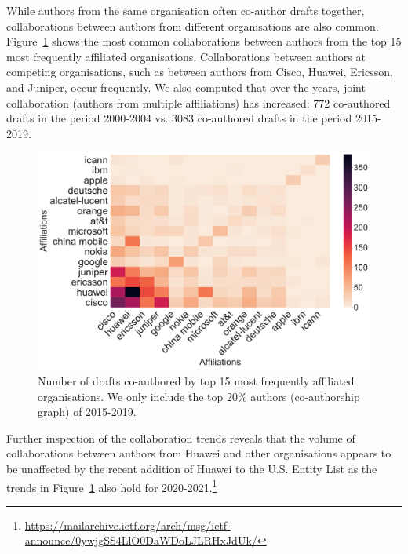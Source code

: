\documentclass[twocolumn,10pt]{article}
\newlength{\figureWidthOneColumn}
\begin{document}
While authors from the same organisation often co-author drafts together,
collaborations between authors from different organisations are also
common.  Figure~\ref{fig:heatmap_2019_coauthordraft_most_frequent_org}
shows the most common collaborations between authors from the top 15 most
frequently affiliated organisations.  Collaborations between authors at
competing organisations, such as between authors from Cisco, Huawei,
Ericsson, and Juniper, occur frequently. We also computed that over the
years, joint collaboration (authors from multiple affiliations) has
increased: 772 co-authored drafts in the period 2000-2004 vs. 3083
co-authored drafts in the period 2015-2019.

\begin{figure}
  \centering
  \includegraphics[width=\figureWidthOneColumn]{figures-prev/icwsm-2022/coauthor_affiliation_network/heatmap_2019_top10_affiliation_collaboration.pdf}
  \caption{
    Number of drafts co-authored by top 15 most frequently affiliated
    organisations. We only include the top 20\% authors (co-authorship
    graph) of 2015-2019.
  }
  \label{fig:heatmap_2019_coauthordraft_most_frequent_org}
\end{figure}

Further inspection of the collaboration trends reveals that the volume of
collaborations between authors from Huawei and other organisations appears
to be unaffected by the recent addition of Huawei to the U.S. Entity List
\cite{bis:2019:entity} as the trends in Figure~\ref{fig:heatmap_2019_coauthordraft_most_frequent_org}
also hold for 2020-2021.\footnote{\tiny\url{https://mailarchive.ietf.org/arch/msg/ietf-announce/0ywjgSS4LlO0DaWDoLJLRHxJdUk/}}

\end{document}
